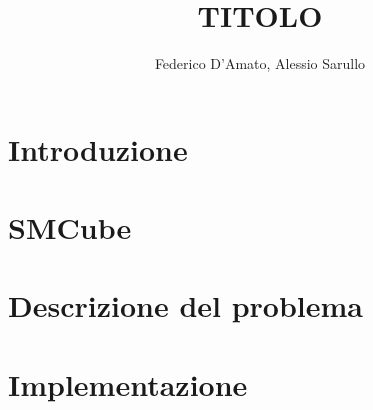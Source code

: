 \documentclass{article}
\title{TITOLO}
\author{Federico D'Amato, Alessio Sarullo}
\begin{document}
\maketitle


\section{Introduzione}

\section{SMCube}

\section{Descrizione del problema}

\section{Implementazione}




\newpage
\nocite{*}		 %
{}

\end{document}
